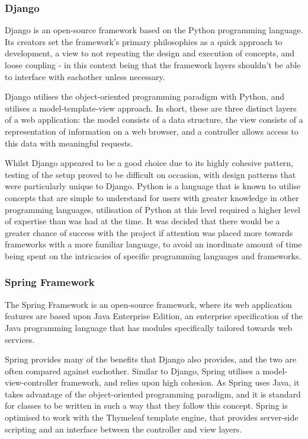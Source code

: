 \subsubsection{Django}

Django is an open-source framework based on the Python programming language. Its creators set the framework's primary philosophies as a quick approach to development, a view to not repeating the design and execution of concepts, and loose coupling - in this context being that the framework layers shouldn't be able to interface with eachother unless necessary\cite{DjangoPhilo}.

Django utilises the object-oriented programming paradigm with Python, and utilises a model-template-view approach. In short, these are three distinct layers of a web application: the model consists of a data structure, the view consists of a representation of information on a web browser, and a controller allows access to this data with meaningful requests\cite{LeffA2001Wdut}.

Whilst Django appeared to be a good choice due to its highly cohesive pattern, testing of the setup proved to be difficult on occasion, with design patterns that were particularly unique to Django. Python is a language that is known to utilise concepts that are simple to understand for users with greater knowledge in other programming languages, utilisation of Python at this level required a higher level of expertise than was had at the time. It was decided that there would be a greater chance of success with the project if attention was placed more towards frameworks with a more familiar language, to avoid an inordinate amount of time being spent on the intricacies of specific programming languages and frameworks.
 
\subsubsection{Spring Framework}

The Spring Framework is an open-source framework, where its web application features are based upon Java Enterprise Edition, an enterprise specification of the Java programming language that has modules specifically tailored towards web services\cite{JavaEE}.

Spring provides many of the benefits that Django also provides, and the two are often compared against eachother. Similar to Django, Spring utilises a model-view-controller framework, and relies upon high cohesion. As Spring uses Java, it takes advantage of the object-oriented programming paradigm, and it is standard for classes to be written in such a way that they follow this concept. Spring is optimised to work with the Thymeleaf template engine, that provides server-side scripting and an interface between the controller and view layers\cite{Thymeleaf}.

